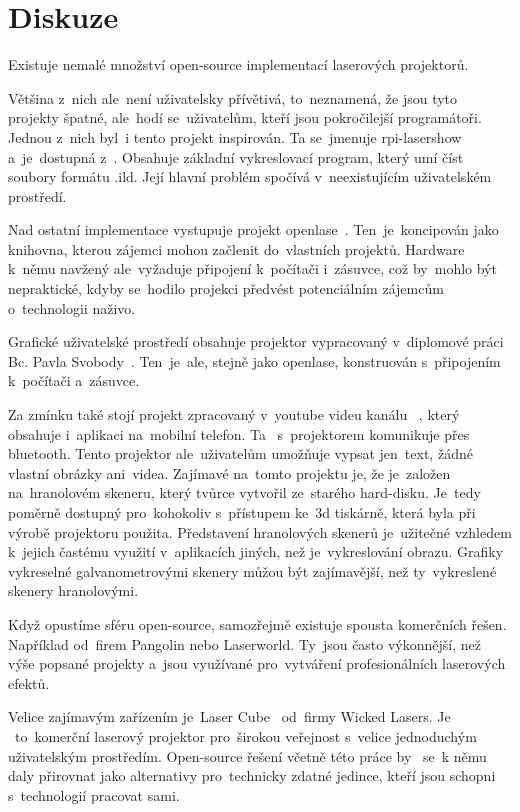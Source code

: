 \chapter{Diskuze}

Existuje nemalé množství open-source implementací laserových projektorů.

Většina z~nich ale~není uživatelsky přívětivá, to~neznamená, že jsou tyto projekty špatné, ale~hodí se~uživatelům, kteří jsou pokročilejší programátoři. 
Jednou z~nich byl~i tento projekt inspirován.
Ta se~jmenuje rpi-lasershow a~je~dostupná z~\cite{rpi-lasershow}. Obsahuje základní vykreslovací program, který umí číst soubory formátu .ild. Její hlavní problém spočívá v~neexistujícím uživatelském prostředí.

Nad ostatní implementace vystupuje projekt openlase~\cite{openlase}. Ten~je~koncipován jako knihovna, kterou zájemci mohou začlenit do~vlastních projektů.
Hardware k~němu navžený ale~vyžaduje připojení k~počítači i~zásuvce, což by~mohlo být nepraktické, kdyby se~hodilo projekci předvést potenciálním zájemcům o~technologii naživo.

Grafické uživatelské prostředí obsahuje projektor vypracovaný v~diplomové práci Bc. Pavla Svobody~\cite{vut-chabr}. Ten~je~ale, stejně jako openlase, konstruován s~připojením k~počítači a~zásuvce.

Za zmínku také stojí projekt zpracovaný v~youtube videu kanálu ~\cite{harddrive-projector-youtube}, který obsahuje i~aplikaci na~mobilní telefon. Ta ~s~projektorem komunikuje přes bluetooth. Tento projektor ale~uživatelům umožňuje vypsat jen~text, žádné vlastní obrázky ani~videa.
Zajímavé na~tomto projektu je, že je~založen na~hranolovém skeneru, který tvůrce vytvořil ze~starého hard-disku. Je~tedy poměrně dostupný pro~kohokoliv s~přístupem ke~3d tiskárně, která byla při výrobě projektoru použita.
Představení hranolových skenerů je~užitečné vzhledem k~jejich častému využití v~aplikacích jiných, než je~vykreslování obrazu. Grafiky vykreselné galvanometrovými skenery můžou být zajímavější, než ty~vykreslené skenery hranolovými.

Když opustíme sféru open-source, samozřejmě existuje spousta komerčních řešen. Například od~firem Pangolin nebo Laserworld. Ty~jsou často výkonnější, než výše popsané projekty a~jsou využívané pro~vytváření profesionálních laserových efektů.

Velice zajímavým zařízením je~Laser Cube~\cite{lasercube} od~firmy Wicked Lasers. Je ~to~komerční laserový projektor pro~širokou veřejnost s~velice jednoduchým uživatelským prostředím. Open-source řešení včetně této práce by ~se~k němu daly přirovnat jako alternativy pro~technicky zdatné jedince, kteří jsou schopni s~technologií pracovat sami.
